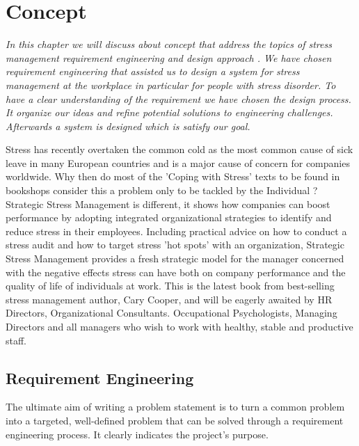\chapter{Concept}
\textit{In  this  chapter  we  will  discuss about concept  that  address  the  topics  of  stress management requirement engineering and design approach .  We  have  chosen requirement engineering  that  assisted  us  to design a system for stress management at  the  workplace  in  particular  for people with stress disorder.  To  have  a  clear understanding of the requirement we have chosen the design process.  It organize our ideas and refine potential solutions to engineering challenges. Afterwards  a  system is designed which is satisfy our goal.}
\vspace{5mm}

Stress has recently overtaken the common cold as the most common cause of sick leave in many European countries and is a major cause of concern for companies worldwide. Why then do most of the 'Coping with Stress' texts to be found in bookshops consider this a problem only to be tackled by the Individual ? Strategic Stress Management is different, it shows how companies can boost performance by adopting integrated organizational strategies to identify and reduce stress in their employees. Including practical advice on how to conduct a stress audit and how to target stress 'hot spots' with an organization, Strategic Stress Management provides a fresh strategic model for the manager concerned with the negative effects stress can have both on company performance and the quality of life of individuals at work. This is the latest book from best-selling stress management author, Cary Cooper, and will be eagerly awaited by HR Directors, Organizational Consultants. Occupational Psychologists, Managing Directors and all managers who wish to work with healthy, stable and productive staff.

\section{Requirement Engineering}
The ultimate aim of writing a problem statement is to turn a common problem into a targeted, well-defined problem that can be solved through a requirement engineering process. It clearly indicates the project's purpose. \citep{K.AduMichael2014InadequateStudy.}

\begin{figure}[ht!]
\centering
{}
  \label{fig:RE}
\end{figure}

